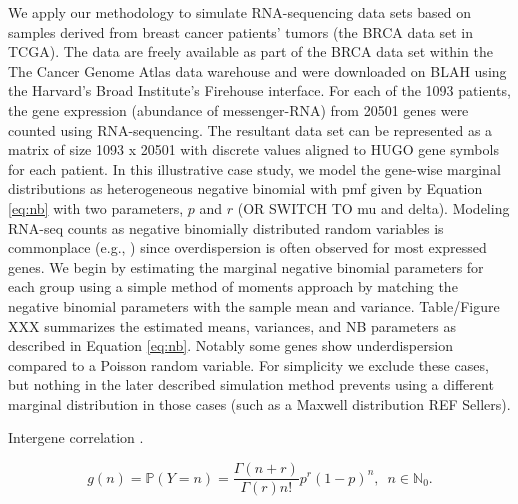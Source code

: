 \documentclass[
]{article}
\begin{document}
We apply our methodology to simulate RNA-sequencing data sets based on samples derived from breast cancer patients' tumors (the BRCA data set in TCGA). The data are freely available as part of the BRCA data set within the The Cancer Genome Atlas data warehouse and were downloaded on BLAH using the Harvard's Broad Institute's Firehouse interface. For each of the 1093 patients, the gene expression (abundance of messenger-RNA) from 20501 genes were counted using RNA-sequencing. The resultant data set can be represented as a matrix of size 1093 x 20501 with discrete values aligned to HUGO gene symbols for each patient. In this illustrative case study, we model the gene-wise marginal distributions as heterogeneous negative binomial with pmf given by Equation \eqref{eq:nb} with two parameters, \(p\) and \(r\) (OR SWITCH TO mu and delta). Modeling RNA-seq counts as negative binomially distributed random variables is commonplace (e.g., \citet{Zhao2018}) since overdispersion is often observed for most expressed genes. We begin by estimating the marginal negative binomial parameters for each group using a simple method of moments approach by matching the negative binomial parameters with the sample mean and variance. Table/Figure XXX summarizes the estimated means, variances, and NB parameters as described in Equation \eqref{eq:nb}. Notably some genes show underdispersion compared to a Poisson random variable. For simplicity we exclude these cases, but nothing in the later described simulation method prevents using a different marginal distribution in those cases (such as a Maxwell distribution REF Sellers).

Intergene correlation \citep{Schissler2019}.

\begin{equation} 
  g(n) = \mathbb P(Y=n) = \frac{\Gamma(n+r)}{\Gamma(r)n!} p^r(1-p)^n, \,\,\, n\in
\mathbb N_0.
  \label{eq:nb}
\end{equation}
\end{document}
